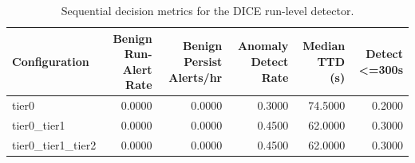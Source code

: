 \begin{table}[t]
\centering
\caption{Sequential decision metrics for the DICE run-level detector.}
\label{tab:dice_sequential_metrics}
\footnotesize
\begin{tabular}{lrrrrr}
\toprule
Configuration & Benign Run-Alert Rate & Benign Persist Alerts/hr & Anomaly Detect Rate & Median TTD (s) & Detect <=300s \\
\midrule
tier0 & 0.0000 & 0.0000 & 0.3000 & 74.5000 & 0.2000 \\
tier0_tier1 & 0.0000 & 0.0000 & 0.4500 & 62.0000 & 0.3000 \\
tier0_tier1_tier2 & 0.0000 & 0.0000 & 0.4500 & 62.0000 & 0.3000 \\
\bottomrule
\end{tabular}

\end{table}

